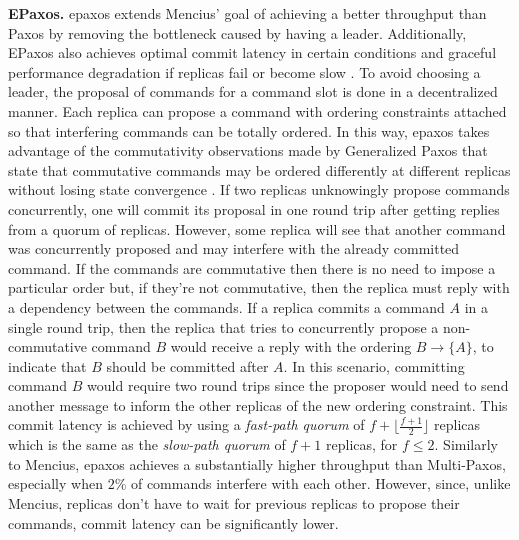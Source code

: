 \textbf{EPaxos.} \acrfull{epaxos} extends Mencius' goal of achieving a better throughput than Paxos by removing the bottleneck caused by having a leader. Additionally, EPaxos also achieves optimal commit latency in certain conditions and graceful performance degradation if replicas fail or become slow \cite{Moraru2013}. To avoid choosing a leader, the proposal of commands for a command slot is done in a decentralized manner. Each replica can propose a command with ordering constraints attached so that interfering commands can be totally ordered. In this way, \acrshort{epaxos} takes advantage of the commutativity observations made by Generalized Paxos that state that commutative commands may be ordered differently at different replicas without losing state convergence \cite{Lamport2005}. If two replicas unknowingly propose commands concurrently, one will commit its proposal in one round trip after getting replies from a quorum of replicas. However, some replica will see that another command was concurrently proposed and may interfere with the already committed command. If the commands are commutative then there is no need to impose a particular order but, if they're not commutative, then the replica must reply with a dependency between the commands. If a replica commits a command $A$ in a single round trip, then the replica that tries to concurrently propose a non-commutative command $B$ would receive a reply with the ordering $B \rightarrow \{A\}$, to indicate that $B$ should be committed after $A$. In this scenario, committing command $B$ would require two round trips since the proposer would need to send another message to inform the other replicas of the new ordering constraint. This commit latency is achieved by using a \textit{fast-path quorum} of $f+\lfloor\frac{f+1}{2}\rfloor$ replicas which is the same as the \textit{slow-path quorum} of $f+1$ replicas, for $f \leq 2$. Similarly to Mencius, \acrshort{epaxos} achieves a substantially higher throughput than Multi-Paxos, especially when $2\%$ of commands interfere with each other. However, since, unlike Mencius, replicas don't have to wait for previous replicas to propose their commands, commit latency can be significantly lower.\par
